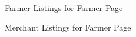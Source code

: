 \documentclass{article}
\begin{document}
\begin{figure}[htbp]
  \centering
  \caption{Farmer Listings for Farmer Page}
\end{figure}

\begin{figure}[htbp]
  \centering
  \caption{Merchant Listings for Farmer Page}
\end{figure}
\end{document}
